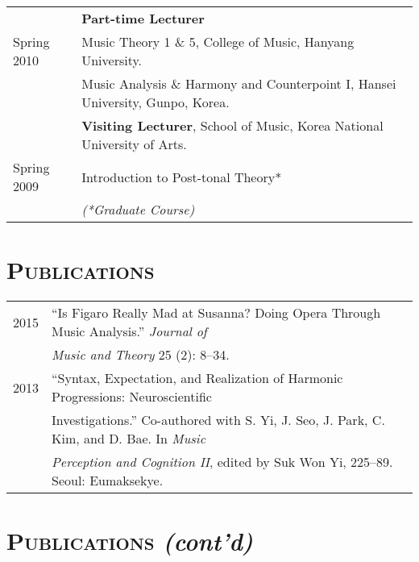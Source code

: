 \documentclass[a4paper,11pt,draft]{article}
\begin{document}
\begin{tabular}{p{2.5cm} l}
    & \textbf{Part-time Lecturer}\\
    Spring 2010 & Music Theory 1 \& 5, College of Music, Hanyang University.\\
    & Music Analysis \& Harmony and Counterpoint I, Hansei University, Gunpo, Korea.\\[2mm]
    
	& \textbf{Visiting Lecturer}, School of Music, Korea National University of Arts.\\
	Spring 2009 & Introduction to Post-tonal Theory*\\[2mm]
	
	& \textit{(*Graduate Course)}
  \end{tabular}
  
  \vspace{5.0mm}
  
  \section*{\textsc{Publications}}
  
  \hspace*{-0.25cm}
  \begin{tabular}{p{2.5cm} p{12.5cm}}
    2015 & ``Is Figaro Really Mad at Susanna? Doing Opera Through Music Analysis.'' \textit{Journal of}\\
    & \textit{Music and Theory} 25 (2): 8--34.\\[2mm]
    
    2013 & “Syntax, Expectation, and Realization of Harmonic Progressions: Neuroscientific\\
    & Investigations.” Co-authored with S. Yi, J. Seo, J. Park, C. Kim, and D. Bae. In \textit{Music} \\
    & \textit{Perception and Cognition II}, edited by Suk Won Yi, 225–89. Seoul: Eumaksekye.
  \end{tabular}
  
  \vspace{2.5mm}
  
  \section*{\textsc{Publications} \textit{(cont'd)}}
  
\end{document}
